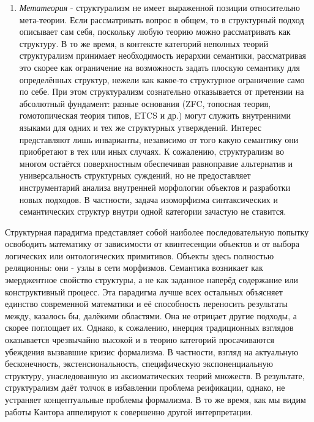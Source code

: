 \documentclass[12pt]{article}
\begin{document}
\begin{enumerate}
    \item {\it Метатеория} - структурализм не имеет выраженной позиции относительно мета-теории. Если рассматривать вопрос в общем, то в структурный подход описывает сам себя, поскольку любую теорию можно рассматривать как структуру. В то же время, в контексте категорий неполных теорий структурализм принимает необходимость иерархии семантики, рассматривая это скорее как ограничение на возможность задать плоскую семантику для определённых структур, нежели как какое-то структурное ограничение само по себе. При этом структурализм сознательно отказывается от претензии на абсолютный фундамент: разные основания (ZFC, топосная теория, гомотопическая теория типов, ETCS и др.) могут служить внутренними языками для одних и тех же структурных утверждений. Интерес представляют лишь инварианты, независимо от того какую семантику они приобретают в тех или иных случаях. К сожалению, структурализм во многом остаётся поверхностным обеспечивая равноправие альтернатив и универсальность структурных суждений, но не предоставляет инструментарий анализа внутренней морфологии объектов и разработки новых подходов. В частности, задача изоморфизма синтаксических и семантических структур внутри одной категории зачастую не ставится.
\end{enumerate}

Структурная парадигма представляет собой наиболее последовательную попытку освободить математику от зависимости от квинтесенции объектов и от выбора логических или онтологических примитивов. Объекты здесь полностью реляционны: они - узлы в сети морфизмов. Семантика возникает как эмерджентное свойство структуры, а не как заданное наперёд содержание или конструктивный процесс. Эта парадигма лучше всех остальных объясняет единство современной математики и её способность переносить результаты между, казалось бы, далёкими областями. Она не отрицает другие подходы, а скорее поглощает их. Однако, к сожалению, инерция традиционных взглядов оказывается чрезвычайно высокой и в теорию категорий просачиваются убеждения вызвавшие кризис формализма. В частности, взгляд на актуальную бесконечность, экстенсиональность, специфическую экспоненциальную структуру, унаследованную из аксиоматических теорий множеств. В результате, структурализм даёт толчок в избавлении проблема реификации, однако, не устраняет концептуальные проблемы формализма. В то же время, как мы видим работы Кантора аппелируют к совершенно другой интерпретации.
\end{document}
